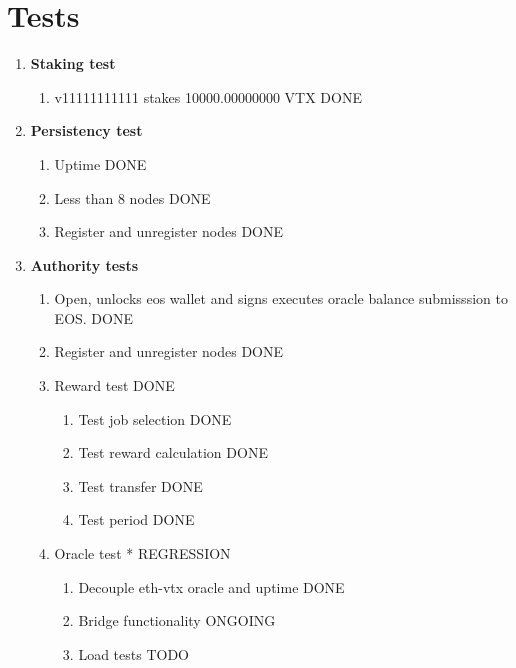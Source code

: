 \documentclass[]{article}
\begin{document}
\section{Tests}
					\begin{enumerate}
						\item \textbf{Staking test}
						\begin{enumerate}
							\item v11111111111 stakes 10000.00000000 VTX  {\color{green} DONE}
						\end{enumerate}
						\item \textbf{Persistency test}  
							\begin{enumerate}
								\item Uptime\textit{} {\color{green} DONE}
								\item Less than 8 nodes {\color{green} DONE}
								\item Register and unregister nodes  {\color{green} DONE}
							\end{enumerate}
						\item \textbf{Authority tests}
							\begin{enumerate}
							\item Open, unlocks eos wallet and signs executes oracle balance submisssion to EOS. {\color{green} DONE}
							\item Register and unregister nodes  {\color{green} DONE}
							\item Reward test	{\color{green} DONE}
								\begin{enumerate}
										\item Test job selection {\color{green} DONE}	
										\item Test reward calculation {\color{green} DONE }	
										\item Test transfer {\color{green} DONE}
										\item Test period {\color{green} DONE}

								\end{enumerate}
								\item Oracle test	* {\color{blue} REGRESSION }
							\begin{enumerate}
								\item Decouple eth-vtx oracle and uptime {\color{green} DONE }
								\item Bridge functionality  {\color{yellow} ONGOING }
								\item Load tests  {\color{red} TODO}
							\end{enumerate}
						\end{enumerate}
				\end{enumerate}
\end{document}
